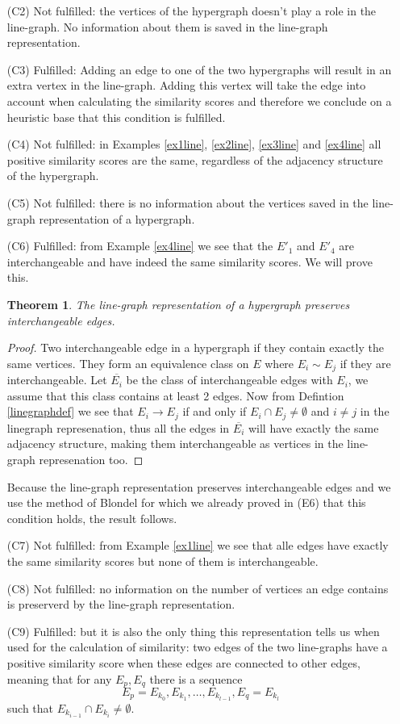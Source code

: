 \documentclass[a4paper,11pt]{report}
\newtheorem{theorem}{Theorem}[section]
\begin{document}
\begin{itemize}
 
   \item[(C2)] Not fulfilled: the vertices of the hypergraph doesn't play a role 
   in the line-graph. No information about them is saved in the line-graph 
   representation.
  \item[(C3)] Fulfilled: Adding an edge to one of the two hypergraphs will 
  result in an extra vertex in the line-graph. Adding this vertex will take the 
  edge into account when calculating the similarity scores and therefore we 
  conclude on a heuristic base that this condition is fulfilled.
  \item[(C4)] Not fulfilled: in Examples \ref{ex1line}, \ref{ex2line}, \ref{ex3line}  
  and \ref{ex4line}
  all positive similarity scores are the same, regardless of the adjacency 
  structure of the hypergraph.
  \item[(C5)] Not fulfilled: there is no information about the vertices saved in 
  the line-graph representation of a hypergraph.
  \item[(C6)] Fulfilled: from Example \ref{ex4line} we see that the $E'_1$ and 
 $E'_4$ are interchangeable and have indeed the same similarity scores. We will 
 prove this.
 
 \begin{theorem}
   The line-graph representation of a hypergraph preserves interchangeable 
   edges.
 \end{theorem}
 \begin{proof}
   Two interchangeable edge in a hypergraph if they contain exactly the same 
   vertices. They form an equivalence class on $E$ where $E_i \sim E_j$ if they 
   are interchangeable. Let $\overline{E_i}$ be the class of interchangeable 
   edges with $E_i$, we assume that this class contains at least 2 edges. Now from Defintion \ref{linegraphdef} we see that
   $E_i \to E_j$ if and only if $E_i \cap E_j \not = \emptyset$ and $i \not = j$ 
   in the linegraph represenation, thus all the edges in $\overline{E_i}$ will 
   have exactly the same adjacency structure, making them interchangeable as vertices in the 
   line-graph represenation too.
 \end{proof}
 Because the line-graph representation preserves interchangeable edges and we use the method of Blondel for which we already proved
 in (E6) that this condition holds, the result follows.
  \item[(C7)] Not fulfilled: from Example \ref{ex1line} we see that alle edges 
  have exactly the same similarity scores but none of them is interchangeable.
   \item[(C8)] Not fulfilled: no information on the number of vertices an edge 
contains is preserverd by the line-graph representation.
  \item[(C9)] Fulfilled: but it is also the only thing this representation tells us 
  when used for the calculation of similarity: two edges of the two line-graphs
  have a positive similarity score when these edges are connected to other edges, meaning that for any $E_p, E_q$ there is a sequence 
  $$E_p = E_{k_0}, E_{k_1}, \ldots, E_{k_{l-1}}, E_q = E_{k_l}$$
  such that $E_{k_{i-1}} \cap E_{k_i} \not = \emptyset$. 
  

\end{itemize}
\end{document}
